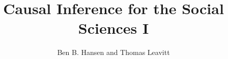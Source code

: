 \documentclass[table, xcolor = {dvipsnames}, 9pt]{beamer}
\title[]{Causal Inference for the Social Sciences I} %
\author{Ben B. Hansen and Thomas Leavitt}
\institute[]
{

}
\date{}
\theoremstyle{plain}
\begin{document}
\begin{frame}
\titlepage %
\end{frame}


\end{document}
